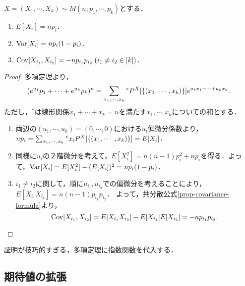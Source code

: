 \documentclass[uplatex,dvipdfmx]{jsreport}
\begin{document}
\begin{example}[多項分布の共分散]
    $X=(X_1,\cdots,X_k)\sim M(n;p_1,\cdots,p_k)$とする．
    \begin{enumerate}
        \item $E[X_i]=np_i$．
        \item $\mathrm{Var}[X_i]=np_i(1-p_i)$．
        \item $\mathrm{Cov}[X_{i_1},X_{i_2}]=-np_{i_1}p_{i_2}\;(i_1\ne i_2\in[k])$．
    \end{enumerate}
\end{example}
\begin{proof}
    多項定理より，
    \[(e^{u_1}p_1+\cdots+e^{u_k}p_k)^n=\sum_{x_1,\cdots,x_k}{}^*P^X[\left\{(x_1,\cdots,x_k)\right\}]e^{u_1x_1+\cdots+u_kx_k}.\]
    ただし，${}^*$は線形関係$x_1+\cdots+x_k=n$を満たす$x_1,\cdots,x_k$についての和とする．
    \begin{enumerate}
        \item 両辺の$(u_1,\cdots,u_k)=(0,\cdots,0)$における$u_i$偏微分係数より，$np_i=\sum_{x_1,\cdots,x_k}{}^*x_iP^X[\left\{(x_1,\cdots,x_k)\right\}]=E[X_i]$．
        \item 同様に$u_i$の２階微分を考えて，$E[X_i^2]=n(n-1)p_i^2+np_i$を得る．よって，$\mathrm{Var}[X_i]=E[X_i^2]-(E[X_i])^2=np_i(1-p_i)$．
        \item $i_1\ne i_2$に関して，順に$u_{i_1},u_{i_2}$での偏微分を考えることにより，$E[X_{i_1}X_{i_2}]=n(n-1)p_{i_1}p_{i_2}$．
        よって，共分散公式\ref{prop-covariance-formula}より，
        \[\mathrm{Cov}[X_{i_1},X_{i_2}]=E[X_{i_1}X_{i_2}]-E[X_{i_1}]E[X_{i_2}]=-np_{i_1}p_{i_2}.\]
    \end{enumerate}
\end{proof}
\begin{remarks}
    証明が技巧的すぎる，多項定理に指数関数を代入する．
\end{remarks}

\subsection{期待値の拡張}
\end{document}
